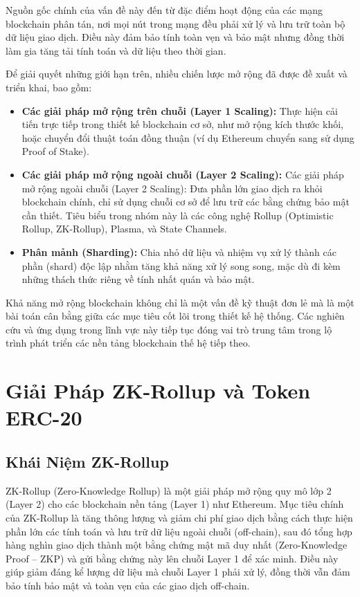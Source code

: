 Nguồn gốc chính của vấn đề này đến từ đặc điểm hoạt động của các mạng blockchain phân tán, nơi mọi nút trong mạng đều phải xử lý và lưu trữ toàn bộ dữ liệu giao dịch. Điều này đảm bảo tính toàn vẹn và bảo mật nhưng đồng thời làm gia tăng tải tính toán và dữ liệu theo thời gian.

Để giải quyết những giới hạn trên, nhiều chiến lược mở rộng đã được đề xuất và triển khai, bao gồm:

\begin{itemize}
    \item \textbf{Các giải pháp mở rộng trên chuỗi (Layer 1 Scaling):} Thực hiện cải tiến trực tiếp trong thiết kế blockchain cơ sở, như mở rộng kích thước khối, hoặc chuyển đổi thuật toán đồng thuận (ví dụ Ethereum chuyển sang sử dụng Proof of Stake).
    \item \textbf{Các giải pháp mở rộng ngoài chuỗi (Layer 2 Scaling):} Các giải pháp mở rộng ngoài chuỗi (Layer 2 Scaling): Đưa phần lớn giao dịch ra khỏi blockchain chính, chỉ sử dụng chuỗi cơ sở để lưu trữ các bằng chứng bảo mật cần thiết. Tiêu biểu trong nhóm này là các công nghệ Rollup (Optimistic Rollup, ZK-Rollup), Plasma, và State Channels.
    \item \textbf{Phân mảnh (Sharding):}  Chia nhỏ dữ liệu và nhiệm vụ xử lý thành các phần (shard) độc lập nhằm tăng khả năng xử lý song song, mặc dù đi kèm những thách thức riêng về tính nhất quán và bảo mật.
\end{itemize}

Khả năng mở rộng blockchain không chỉ là một vấn đề kỹ thuật đơn lẻ mà là một bài toán cân bằng giữa các mục tiêu cốt lõi trong thiết kế hệ thống. Các nghiên cứu và ứng dụng trong lĩnh vực này tiếp tục đóng vai trò trung tâm trong lộ trình phát triển các nền tảng blockchain thế hệ tiếp theo.
 

\section{Giải Pháp ZK-Rollup và Token ERC-20}

\subsection{Khái Niệm ZK-Rollup}
ZK-Rollup (Zero-Knowledge Rollup) là một giải pháp mở rộng quy mô lớp 2 (Layer 2) cho các blockchain nền tảng (Layer 1) như Ethereum. Mục tiêu chính của ZK-Rollup là tăng thông lượng và giảm chi phí giao dịch bằng cách thực hiện phần lớn các tính toán và lưu trữ dữ liệu ngoài chuỗi (off-chain), sau đó tổng hợp hàng nghìn giao dịch thành một bằng chứng mật mã duy nhất (Zero-Knowledge Proof -- ZKP) và gửi bằng chứng này lên chuỗi Layer 1 để xác minh. Điều này giúp giảm đáng kể lượng dữ liệu mà chuỗi Layer 1 phải xử lý, đồng thời vẫn đảm bảo tính bảo mật và toàn vẹn của các giao dịch off-chain.

